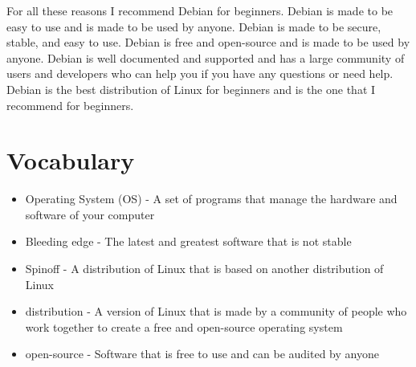 For all these reasons I recommend Debian for beginners. Debian is made to be easy to use and is made to be used by anyone. Debian is made to be secure, stable, and easy to use. Debian is free and open-source and is made to be used by anyone. Debian is well documented and supported and has a large community of users and developers who can help you if you have any questions or need help. Debian is the best distribution of Linux for beginners and is the one that I recommend for beginners.

\section{Vocabulary}
\begin{itemize}
    \item Operating System (OS) - A set of programs that manage the hardware and software of your computer
    \item Bleeding edge - The latest and greatest software that is not stable
    \item Spinoff - A distribution of Linux that is based on another distribution of Linux
    \item distribution - A version of Linux that is made by a community of people who work together to create a free and open-source operating system
    \item open-source - Software that is free to use and can be audited by anyone
\end{itemize}
